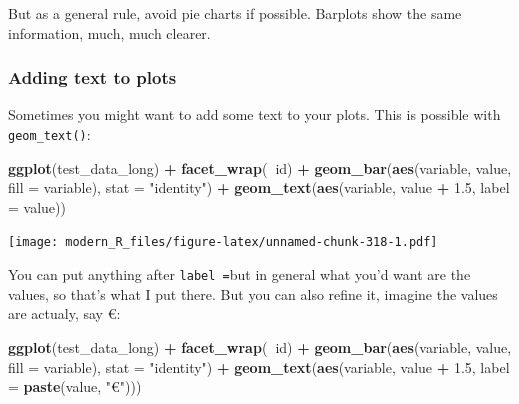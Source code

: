 \documentclass[]{gitbook}
\newenvironment{Shaded}{\begin{snugshade}}{\end{snugshade}}
\newcommand{\DataTypeTok}[1]{\textcolor[rgb]{0.13,0.29,0.53}{#1}}
\newcommand{\FloatTok}[1]{\textcolor[rgb]{0.00,0.00,0.81}{#1}}
\newcommand{\KeywordTok}[1]{\textcolor[rgb]{0.13,0.29,0.53}{\textbf{#1}}}
\newcommand{\NormalTok}[1]{#1}
\newcommand{\OperatorTok}[1]{\textcolor[rgb]{0.81,0.36,0.00}{\textbf{#1}}}
\newcommand{\StringTok}[1]{\textcolor[rgb]{0.31,0.60,0.02}{#1}}
\theoremstyle{definition}
\theoremstyle{definition}
\theoremstyle{definition}
\theoremstyle{remark}
\begin{document}
But as a general rule, avoid pie charts if possible. Barplots show the
same information, much, much clearer.

\hypertarget{adding-text-to-plots}{%
\subsubsection{Adding text to plots}\label{adding-text-to-plots}}

Sometimes you might want to add some text to your plots. This is
possible with \texttt{geom\_text()}:

\begin{Shaded}
\begin{Highlighting}[]
\KeywordTok{ggplot}\NormalTok{(test_data_long) }\OperatorTok{+}
\StringTok{  }\KeywordTok{facet_wrap}\NormalTok{(}\OperatorTok{~}\NormalTok{id) }\OperatorTok{+}
\StringTok{  }\KeywordTok{geom_bar}\NormalTok{(}\KeywordTok{aes}\NormalTok{(variable, value, }\DataTypeTok{fill =}\NormalTok{ variable), }\DataTypeTok{stat =} \StringTok{"identity"}\NormalTok{) }\OperatorTok{+}
\StringTok{  }\KeywordTok{geom_text}\NormalTok{(}\KeywordTok{aes}\NormalTok{(variable, value }\OperatorTok{+}\StringTok{ }\FloatTok{1.5}\NormalTok{, }\DataTypeTok{label =}\NormalTok{ value))}
\end{Highlighting}
\end{Shaded}

\texttt{[image: modern\_R\_files/figure-latex/unnamed-chunk-318-1.pdf]}

You can put anything after \texttt{label\ =}but in general what you'd
want are the values, so that's what I put there. But you can also refine
it, imagine the values are actualy, say €:

\begin{Shaded}
\begin{Highlighting}[]
\KeywordTok{ggplot}\NormalTok{(test_data_long) }\OperatorTok{+}
\StringTok{  }\KeywordTok{facet_wrap}\NormalTok{(}\OperatorTok{~}\NormalTok{id) }\OperatorTok{+}
\StringTok{  }\KeywordTok{geom_bar}\NormalTok{(}\KeywordTok{aes}\NormalTok{(variable, value, }\DataTypeTok{fill =}\NormalTok{ variable), }\DataTypeTok{stat =} \StringTok{"identity"}\NormalTok{) }\OperatorTok{+}
\StringTok{  }\KeywordTok{geom_text}\NormalTok{(}\KeywordTok{aes}\NormalTok{(variable, value }\OperatorTok{+}\StringTok{ }\FloatTok{1.5}\NormalTok{, }\DataTypeTok{label =} \KeywordTok{paste}\NormalTok{(value, }\StringTok{"€"}\NormalTok{)))}
\end{Highlighting}
\end{Shaded}
\end{document}
